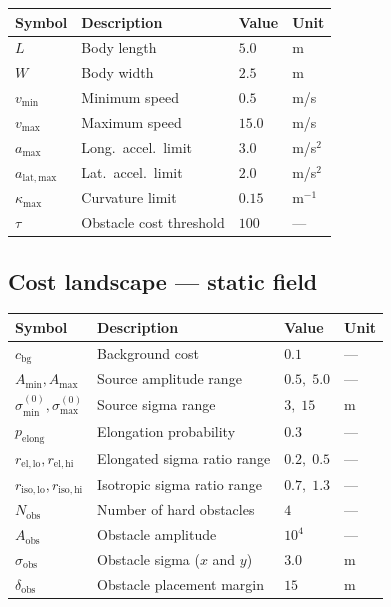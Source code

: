 \documentclass[11pt,a4paper]{article}
\begin{document}
\begin{center}
\begin{tabular}{llll}
\toprule
Symbol & Description & Value & Unit \\
\midrule
$L$                    & Body length          & $5.0$   & m \\
$W$                    & Body width           & $2.5$   & m \\
$v_{\min}$             & Minimum speed        & $0.5$   & m/s \\
$v_{\max}$             & Maximum speed        & $15.0$  & m/s \\
$a_{\max}$             & Long.\ accel.\ limit & $3.0$   & m/s$^2$ \\
$a_{\mathrm{lat,max}}$ & Lat.\ accel.\ limit  & $2.0$   & m/s$^2$ \\
$\kappa_{\max}$        & Curvature limit      & $0.15$  & m$^{-1}$ \\
$\tau$                 & Obstacle cost threshold & $100$ & --- \\
\bottomrule
\end{tabular}
\end{center}

\subsection*{Cost landscape --- static field}

\begin{center}
\begin{tabular}{llll}
\toprule
Symbol & Description & Value & Unit \\
\midrule
$c_{\mathrm{bg}}$       & Background cost               & $0.1$        & --- \\
$A_{\min}, A_{\max}$    & Source amplitude range        & $0.5,\;5.0$  & --- \\
$\sigma_{\min}^{(0)}, \sigma_{\max}^{(0)}$ & Source sigma range & $3,\;15$ & m \\
$p_{\mathrm{elong}}$    & Elongation probability        & $0.3$        & --- \\
$r_{\mathrm{el,lo}}, r_{\mathrm{el,hi}}$   & Elongated sigma ratio range & $0.2,\;0.5$ & --- \\
$r_{\mathrm{iso,lo}}, r_{\mathrm{iso,hi}}$ & Isotropic sigma ratio range & $0.7,\;1.3$ & --- \\
$N_{\mathrm{obs}}$      & Number of hard obstacles      & $4$          & --- \\
$A_{\mathrm{obs}}$      & Obstacle amplitude            & $10^4$       & --- \\
$\sigma_{\mathrm{obs}}$ & Obstacle sigma ($x$ and $y$)  & $3.0$        & m \\
$\delta_{\mathrm{obs}}$ & Obstacle placement margin     & $15$         & m \\
\bottomrule
\end{tabular}
\end{center}
\end{document}
